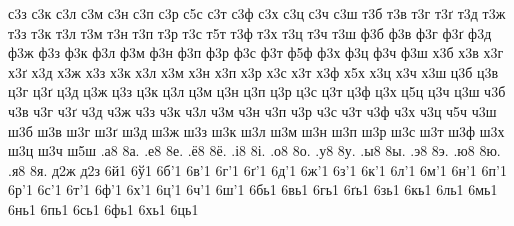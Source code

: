 {с3з
с3к
с3л
с3м
с3н
с3п
с3р
с5с
с3т
с3ф
с3х
с3ц
с3ч
с3ш
т3б
т3в
т3г
т3ґ
т3д
т3ж
т3з
т3к
т3л
т3м
т3н
т3п
т3р
т3с
т5т
т3ф
т3х
т3ц
т3ч
т3ш
ф3б
ф3в
ф3г
ф3ґ
ф3д
ф3ж
ф3з
ф3к
ф3л
ф3м
ф3н
ф3п
ф3р
ф3с
ф3т
ф5ф
ф3х
ф3ц
ф3ч
ф3ш
х3б
х3в
х3г
х3ґ
х3д
х3ж
х3з
х3к
х3л
х3м
х3н
х3п
х3р
х3с
х3т
х3ф
х5х
х3ц
х3ч
х3ш
ц3б
ц3в
ц3г
ц3ґ
ц3д
ц3ж
ц3з
ц3к
ц3л
ц3м
ц3н
ц3п
ц3р
ц3с
ц3т
ц3ф
ц3х
ц5ц
ц3ч
ц3ш
ч3б
ч3в
ч3г
ч3ґ
ч3д
ч3ж
ч3з
ч3к
ч3л
ч3м
ч3н
ч3п
ч3р
ч3с
ч3т
ч3ф
ч3х
ч3ц
ч5ч
ч3ш
ш3б
ш3в
ш3г
ш3ґ
ш3д
ш3ж
ш3з
ш3к
ш3л
ш3м
ш3н
ш3п
ш3р
ш3с
ш3т
ш3ф
ш3х
ш3ц
ш3ч
ш5ш
%
%
%
.а8
8а.
.е8
8е.
.ё8
8ё.
.і8
8і.
.о8
8о.
.у8
8у.
.ы8
8ы.
.э8
8э.
.ю8
8ю.
.я8
8я.
%
%
%
%
%
д2ж
д2з
%
%
%
6й1
6ў1
%
%
%
6б'1
6в'1
6г'1
6ґ'1
6д'1
6ж'1
6з'1
6к'1
6л'1
6м'1
6н'1
6п'1
6р'1
6с'1
6т'1
6ф'1
6х'1
6ц'1
6ч'1
6ш'1
6бь1
6вь1
6гь1
6ґь1
6зь1
6кь1
6ль1
6мь1
6нь1
6пь1
6сь1
6фь1
6хь1
6ць1
%
}
